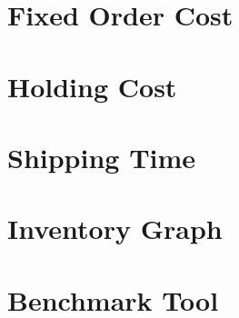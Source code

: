 \section{Fixed Order Cost}
\label{section:fixed_order_cost}
\section{Holding Cost}
\label{section:holding_cost}

\section{Shipping Time}
\label{section:shipping_time}

\section{Inventory Graph}
\label{section:inventory_graph}

\section{Benchmark Tool}
\label{section:benchmark_tool}

